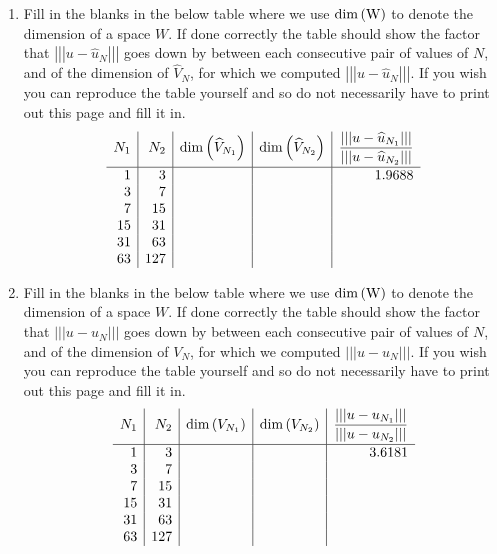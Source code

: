 \begin{enumerate}
\vspace*{1em}
\item Fill in the blanks in the below table where we use $\rm{dim}\left(W\right)$ to denote the dimension of a space $W$. If done correctly the table should show the factor that $\left|\left|\left|u-\widehat{u}_N\right|\right|\right|$ goes down by between each consecutive pair of values of $N$, and of the dimension of $\widehat{V}_N$, for which we computed $\left|\left|\left|u-\widehat{u}_N\right|\right|\right|$. If you wish you can reproduce the table yourself and so do not necessarily have to print out this page and fill it in.
\[
\begin{array}{r|r|r|r|r}
N_1 & N_2 & {\rm dim}\left(\widehat{V}_{N_1}\right) & {\rm dim}\left(\widehat{V}_{N_2}\right) & \displaystyle{{\left|\left|\left|u-\widehat{u}_{N_1}\right|\right|\right| \over \left|\left|\left|u-\widehat{u}_{N_2}\right|\right|\right|}}
\\[.75em]
\hline
1 & 3 & \mbox{ } & \mbox{ } & 1.9688
\\
3 & 7 & \mbox{ } & \mbox{ } & \mbox{ }
\\
7 & 15 & \mbox{ } & \mbox{ } & \mbox{ }
\\
15 & 31 & \mbox{ } & \mbox{ } & \mbox{ }
\\
31 & 63 & \mbox{ } & \mbox{ } & \mbox{ }
\\
63 & 127 & \mbox{ }  & \mbox{ } & \mbox{ }
\end{array}
\]

\vspace*{1em}
\item Fill in the blanks in the below table where we use $\rm{dim}\left(W\right)$ to denote the dimension of a space $W$. If done correctly the table should show the factor that $\left|\left|\left|u-u_N\right|\right|\right|$ goes down by between each consecutive pair of values of $N$, and of the dimension of $V_N$, for which we computed $\left|\left|\left|u-u_N\right|\right|\right|$. If you wish you can reproduce the table yourself and so do not necessarily have to print out this page and fill it in.
\[
\begin{array}{r|r|r|r|r}
N_1 & N_2 & {\rm dim}\left(V_{N_1}\right) & {\rm dim}\left(V_{N_2}\right) & \displaystyle{{\left|\left|\left|u-u_{N_1}\right|\right|\right| \over \left|\left|\left|u-u_{N_2}\right|\right|\right|}}
\\[.75em]
\hline
1 & 3 & \mbox{ } & \mbox{ } & 3.6181
\\
3 & 7 & \mbox{ } & \mbox{ } & \mbox{ }
\\
7 & 15 & \mbox{ } & \mbox{ } & \mbox{ }
\\
15 & 31 & \mbox{ } & \mbox{ } & \mbox{ }
\\
31 & 63 & \mbox{ } & \mbox{ } & \mbox{ }
\\
63 & 127 & \mbox{ } & \mbox{ } & \mbox{ }
\end{array}
\]
\end{enumerate}


